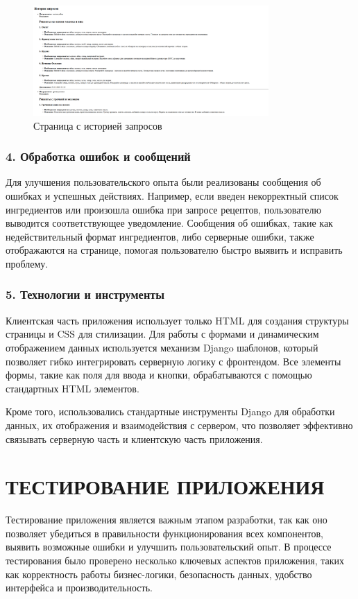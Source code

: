 {{    \begin{figure}[H]
        \centering
        \includegraphics[width=0.8\textwidth]{assets/requests_history.png} 
        \caption{Страница с историей запросов}
    \end{figure}
    
    \subsubsection*{4. Обработка ошибок и сообщений}
    
    Для улучшения пользовательского опыта были реализованы сообщения об ошибках и успешных действиях. Например, если введен некорректный список ингредиентов или произошла ошибка при запросе рецептов, пользователю выводится соответствующее уведомление. Сообщения об ошибках, такие как недействительный формат ингредиентов, либо серверные ошибки, также отображаются на странице, помогая пользователю быстро выявить и исправить проблему.
    
    \subsubsection*{5. Технологии и инструменты}
    
    Клиентская часть приложения использует только HTML для создания структуры страницы и CSS для стилизации. Для работы с формами и динамическим отображением данных используется механизм Django шаблонов, который позволяет гибко интегрировать серверную логику с фронтендом. Все элементы формы, такие как поля для ввода и кнопки, обрабатываются с помощью стандартных HTML элементов.
    
    Кроме того, использовались стандартные инструменты Django для обработки данных, их отображения и взаимодействия с сервером, что позволяет эффективно связывать серверную часть и клиентскую часть приложения.
    
}

\newpage

\section{\MakeUppercase{Тестирование приложения}}
Тестирование приложения является важным этапом разработки, так как оно позволяет убедиться в правильности функционирования всех компонентов, выявить возможные ошибки и улучшить пользовательский опыт. В процессе тестирования было проверено несколько ключевых аспектов приложения, таких как корректность работы бизнес-логики, безопасность данных, удобство интерфейса и производительность.

}
